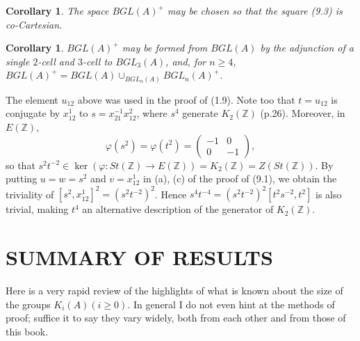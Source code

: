 \documentclass[openany,leqno]{book}  %
\newtheorem{corollary}[theorem]{Corollary}
\begin{document}
\begin{corollary}
  The space $BGL(A)^+$ may be chosen so that the square (9.3) is co-Cartesian.
\end{corollary}
\begin{corollary}
  $BGL(A)^+$ may be formed from $BGL(A)$ by the adjunction of a single $2$-cell and $3$-cell to $BGL_3(A)$, and, for $n\geqslant 4$, $BGL(A)^+=BGL(A)\cup_{BGL_n(A)}BGL_n(A)^+$.
\end{corollary}
The element $u_{12}$ above was used in the proof of (1.9). Note too that $t=u_{12}$ is conjugate by $x_{12}^1$ to $s=x_{21}^{-1}x_{12}^2$, where $s^4$ generate $K_2(\mathbb{Z})$ (p.26). Moreover, in $E(\mathbb{Z})$,
\[\varphi(s^2)=\varphi(t^2)= \begin{pmatrix}-1 &0 \\ 0 & -1\end{pmatrix},\]
so that $s^2 t^{-2} \in \ker(\varphi\colon   St(\mathbb{Z})\longrightarrow E(\mathbb{Z}))=K_2(\mathbb{Z})=Z(St(\mathbb{Z}))$.
 By putting $u=w=s^2$ and $v=x_{12}^1$ in (a), (c) of the proof of (9.1), we obtain the triviality of $[s^2, x_{12}^1]^2=(s^2 t^{-2})^2$. Hence $s^4 t^{-4}=(s^2 t^{-2})^2 [t^2 s^{-2}, t^2]$ is also trivial, making $t^4$ an alternative description of the generator of $K_2(\mathbb{Z})$.
\section*{SUMMARY OF RESULTS }
Here is a very rapid review of the highlights of what is known about the size of the groups $K_i(A) (i\geqslant 0)$. In general I do not even hint at the methods of proof; suffice it to say they vary widely, both from each other and from those of this book.
\end{document}
